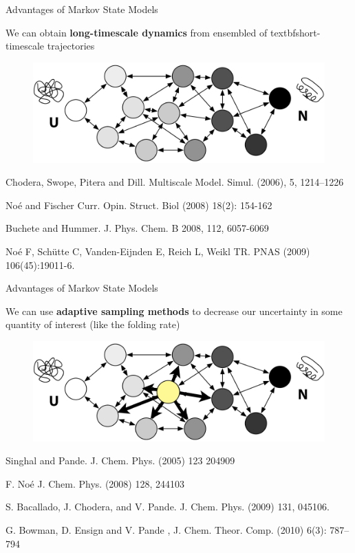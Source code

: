 \documentclass{beamer}
\begin{document}
\begin{frame}{Advantages of Markov State Models}

We can obtain \textbf{long-timescale dynamics} from ensembled of textbf{short-timescale} trajectories 
\begin{figure}
\includegraphics[width=1.0\textwidth]{network1}
\end{figure}


\tiny
Chodera, Swope,  Pitera  and Dill. Multiscale Model. Simul. (2006), 5, 1214–1226

No\'{e} and Fischer Curr. Opin. Struct. Biol  (2008) 18(2): 154-162

Buchete and Hummer.  J. Phys. Chem. B 2008, 112, 6057-6069

No\'{e} F, Sch\"{u}tte C, Vanden-Eijnden E, Reich L, Weikl TR.  PNAS (2009) 106(45):19011-6.
\normalsize

\end{frame}

\begin{frame}{Advantages of Markov State Models}

We can use \textbf{adaptive sampling methods} to decrease our uncertainty in some quantity of interest (like the folding rate)  
\begin{figure}
\includegraphics[width=1.0\textwidth]{network2}
\end{figure}


\tiny
Singhal and Pande.  J. Chem. Phys. (2005) 123 204909

F. No\'{e}  J. Chem. Phys. (2008) 128, 244103

S. Bacallado, J. Chodera, and V. Pande.  J. Chem. Phys. (2009) 131, 045106. 

G. Bowman, D. Ensign and V. Pande , J. Chem. Theor. Comp. (2010) 6(3):  787–794

\normalsize

\end{frame}
\end{document}
